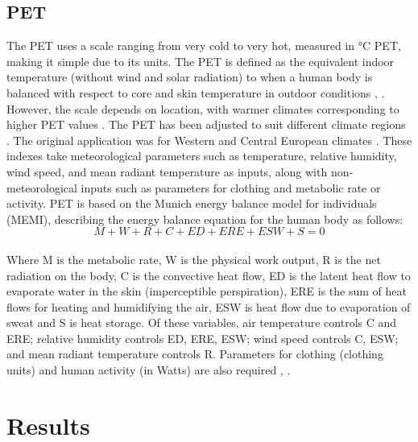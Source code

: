 \documentclass[twocolumn, a4paper]{article}
\begin{document}
\subsection{PET}
The PET uses a scale ranging from very cold to very hot, measured in °C PET, making it simple due to its units. The PET is defined as the equivalent indoor temperature (without wind and solar radiation) to when a human body is balanced with respect to core and skin temperature in outdoor conditions \cite{RN2062}, \cite{RN2063}. However, the scale depends on location, with warmer climates corresponding to higher PET values \cite{RN2050}. The PET has been adjusted to suit different climate regions \cite{RN2068}. The original application was for Western and Central European climates \cite{RN2064}. These indexes take meteorological parameters such as temperature, relative humidity, wind speed, and mean radiant temperature as inputs, along with non-meteorological inputs such as parameters for clothing and metabolic rate or activity. PET is based on the Munich energy balance model for individuals (MEMI), describing the energy balance equation for the human body as follows:
\\
\begin{equation}
	M + W + R + C + ED + ERE + ESW + S = 0
      \end{equation}
      \\
Where M is the metabolic rate, W is the physical work output, R is the net radiation on the body, C is the convective heat flow, ED is the latent heat flow to evaporate water in the skin (imperceptible perspiration), ERE is the sum of heat flows for heating and humidifying the air, ESW is heat flow due to evaporation of sweat and S is heat storage. Of these variables, air temperature controls C and ERE; relative humidity controls ED, ERE, ESW; wind speed controls C, ESW; and mean radiant temperature controls R. Parameters for clothing (clothing units) and human activity (in Watts) are also required \cite{RN2062}, \cite{RN2044}.

\section{Results}
\end{document}
